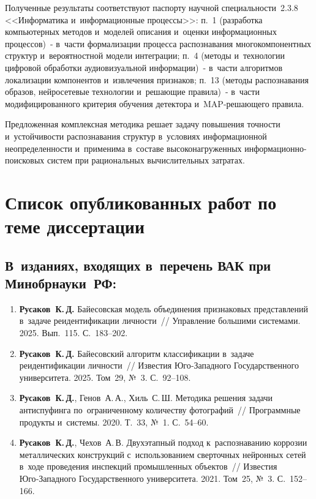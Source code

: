 Полученные результаты соответствуют паспорту научной специальности~2.3.8
<<Информатика и~информационные процессы>>: п.~1 (разработка компьютерных
методов и~моделей описания и~оценки информационных процессов)~- в~части
формализации процесса распознавания многокомпонентных структур
и~вероятностной модели интеграции; п.~4 (методы и~технологии цифровой
обработки аудиовизуальной информации)~- в~части алгоритмов локализации
компонентов и~извлечения признаков; п.~13 (методы распознавания образов,
нейросетевые технологии и~решающие правила)~- в~части модифицированного
критерия обучения детектора и~MAP-решающего правила.

Предложенная комплексная методика решает
задачу повышения точности и~устойчивости распознавания структур в~условиях
информационной неопределенности и~применима в~составе
высоконагруженных информационно-поисковых систем при рациональных
вычислительных затратах.

\section*{Список опубликованных работ по теме диссертации}

\subsection*{В~изданиях, входящих в~перечень ВАК при Минобрнауки~РФ:}

\begin{enumerate}
    \item \textbf{Русаков~К.\,Д.} Байесовская модель объединения признаковых
          представлений в~задаче реидентификации личности~// Управление большими
          системами. 2025. Вып.~115. С.~183--202.
    \item \textbf{Русаков~К.\,Д.} Байесовский алгоритм классификации в~задаче
          реидентификации личности~// Известия Юго‑Западного Государственного
          университета. 2025. Том~29, №~3. С.~92--108.
    \item \textbf{Русаков~К.\,Д.}, Генов~А.\,А., Хиль~С.\,Ш. Методика решения
          задачи антиспуфинга по~ограниченному количеству фотографий~//
          Программные продукты и~системы. 2020. Т.~33, №~1. С.~54--60.
    \item \textbf{Русаков~К.\,Д.}, Чехов~А.\,В. Двухэтапный подход
          к~распознаванию коррозии металлических конструкций с~использованием
          сверточных нейронных сетей в~ходе проведения инспекций промышленных
          объектов~// Известия Юго‑Западного Государственного университета. 2021.
          Том~25, №~3. С.~152--166.
\end{enumerate}

